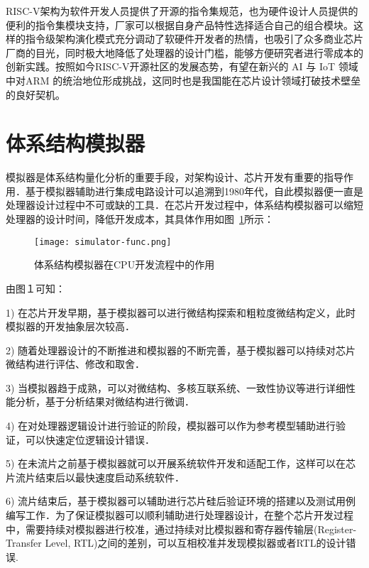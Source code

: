 




RISC-V架构为软件开发人员提供了开源的指令集规范，也为硬件设计人员提供的便利的指令集模块支持，厂家可以根据自身产品特性选择适合自己的组合模块。这样的指令级架构演化模式充分调动了软硬件开发者的热情，也吸引了众多商业芯片厂商的目光，同时极大地降低了处理器的设计门槛，能够方便研究者进行零成本的创新实践。按照如今RISC-V开源社区的发展态势，有望在新兴的 AI 与 IoT 领域中对ARM 的统治地位形成挑战，这同时也是我国能在芯片设计领域打破技术壁垒的良好契机。

\section{体系结构模拟器}
模拟器是体系结构量化分析的重要手段，对架构设计、芯片开发有重要的指导作用．基于模拟器辅助进行集成电路设计可以追溯到1980年代\cite{mukherjee2002performance}，自此模拟器便一直是处理器设计过程中不可或缺的工具．在芯片开发过程中，体系结构模拟器可以缩短处理器的设计时间，降低开发成本，其具体作用如图~\ref{fig:sim-func}所示：
\begin{figure}[h]
  \centering
  \texttt{[image: simulator-func.png]}
  \caption{体系结构模拟器在CPU开发流程中的作用}
  \label{fig:sim-func}
\end{figure}


由图１可知：


1) 在芯片开发早期，基于模拟器可以进行微结构探索和粗粒度微结构定义，此时模拟器的开发抽象层次较高．


2) 随着处理器设计的不断推进和模拟器的不断完善，基于模拟器可以持续对芯片微结构进行评估、修改和取舍．


3) 当模拟器趋于成熟，可以对微结构、多核互联系统、一致性协议等进行详细性能分析，基于分析结果对微结构进行微调．


4) 在对处理器逻辑设计进行验证的阶段，模拟器可以作为参考模型辅助进行验证，可以快速定位逻辑设计错误．


5) 在未流片之前基于模拟器就可以开展系统软件开发和适配工作，这样可以在芯片流片结束后以最快速度启动系统软件．


6) 流片结束后，基于模拟器可以辅助进行芯片硅后验证环境的搭建以及测试用例编写工作\cite{brooks2000wattch}．为了保证模拟器可以顺利辅助进行处理器设计，在整个芯片开发过程中，需要持续对模拟器进行校准，通过持续对比模拟器和寄存器传输层(Register-Transfer Level, RTL)之间的差别，可以互相校准并发现模拟器或者RTL的设计错误\cite{hourui}.


